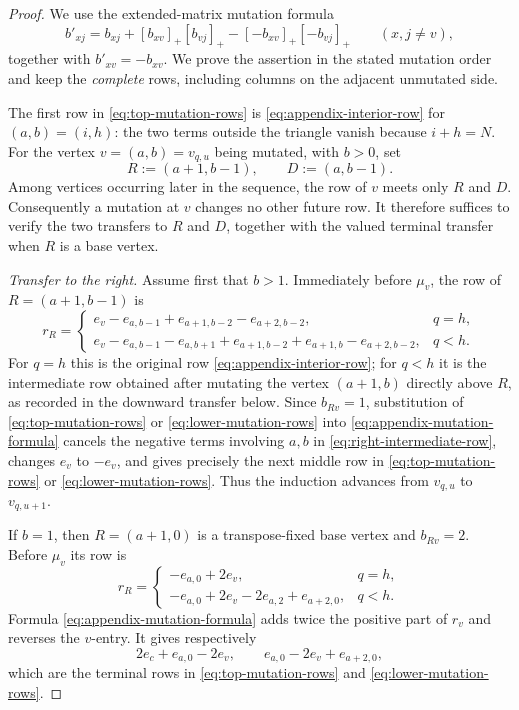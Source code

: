 \documentclass[11pt]{amsart}
\theoremstyle{definition}
\theoremstyle{remark}
\begin{document}
\begin{proof}
We use the extended-matrix mutation formula
\begin{equation}
 b'_{xj}=b_{xj}+[b_{xv}]_+[b_{vj}]_+
                 -[-b_{xv}]_+[-b_{vj}]_+
 \qquad(x,j\ne v),
 \label{eq:appendix-mutation-formula}
\end{equation}
together with $b'_{xv}=-b_{xv}$.  We prove the assertion in the stated
mutation order and keep the \emph{complete} rows, including columns on the
adjacent unmutated side.

The first row in \eqref{eq:top-mutation-rows} is
\eqref{eq:appendix-interior-row} for $(a,b)=(i,h)$: the two terms outside
the triangle vanish because $i+h=N$.  For the vertex $v=(a,b)=v_{q,u}$ being mutated, with $b>0$, set
\[ R:=(a+1,b-1),\qquad D:=(a,b-1). \]
Among vertices occurring later in the sequence, the row of $v$ meets only
$R$
and $D$.  Consequently a mutation at $v$ changes no other future row.  It
therefore suffices to verify the two transfers to $R$ and $D$, together
with the valued terminal transfer when $R$ is a base vertex.

\smallskip
\noindent\emph{Transfer to the right.}
Assume first that $b>1$.  Immediately before $\mu_v$, the row of
$R=(a+1,b-1)$ is
\begin{equation}
 r_R=
 \begin{cases}
  e_v-e_{a,b-1}+e_{a+1,b-2}-e_{a+2,b-2},&q=h,\\
  e_v-e_{a,b-1}-e_{a,b+1}
      +e_{a+1,b-2}+e_{a+1,b}-e_{a+2,b-2},&q<h.
 \end{cases}
 \label{eq:right-intermediate-row}
\end{equation}
For $q=h$ this is the original row
\eqref{eq:appendix-interior-row}; for $q<h$ it is the intermediate row obtained after mutating
the vertex $(a+1,b)$ directly above $R$, as recorded in the
downward transfer below.  Since $b_{Rv}=1$, substitution of
\eqref{eq:top-mutation-rows} or \eqref{eq:lower-mutation-rows} into
\eqref{eq:appendix-mutation-formula} cancels the negative terms involving
$a,b$ in \eqref{eq:right-intermediate-row}, changes $e_v$ to $-e_v$, and gives
precisely the next middle row in \eqref{eq:top-mutation-rows} or
\eqref{eq:lower-mutation-rows}.  Thus the induction advances from
$v_{q,u}$ to $v_{q,u+1}$.

If $b=1$, then $R=(a+1,0)$ is a transpose-fixed base vertex and
$b_{Rv}=2$.  Before $\mu_v$ its row is
\[
 r_R=
 \begin{cases}
  -e_{a,0}+2e_v,&q=h,\\
  -e_{a,0}+2e_v-2e_{a,2}+e_{a+2,0},&q<h.
 \end{cases}
\]
Formula \eqref{eq:appendix-mutation-formula} adds twice the positive part
of $r_v$ and reverses the $v$-entry.  It gives respectively
\[ 2e_c+e_{a,0}-2e_v, \qquad e_{a,0}-2e_v+e_{a+2,0}, \]
which are the terminal rows in \eqref{eq:top-mutation-rows} and
\eqref{eq:lower-mutation-rows}.


\end{proof}
\end{document}
